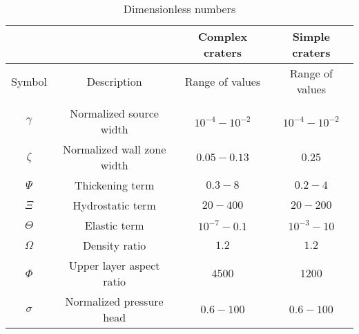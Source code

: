 \begin{table}
  \caption{Dimensionless numbers}
  \centering
  \begin{tabular}{c|c|c|c}
    &&Complex craters&Simple craters \\
    \hline
    Symbol& Description & Range of values & Range of values \\
    \hline
    &&\\
    $\gamma$&Normalized source width& $10^{-4}-10^{-2}$ &$10^{-4}-10^{-2}$ \\
    $\zeta$& Normalized wall zone width  & $0.05-0.13$&$0.25$\\
    $\Psi$&Thickening term & $0.3-8$&$0.2-4$\\
    $\Xi$& Hydrostatic term & $20-400$&$20-200$\\
    $\Theta$ &Elastic term & $10^{-7}-0.1$&$10^{-3}-10$\\
    $\Omega$ & Density ratio & $1.2$ &$1.2$\\
    $\Phi$ & Upper layer aspect ratio & $4500$ &$1200 $\\
    $\sigma$&Normalized pressure head& $0.6-100$ & $0.6-100$ 
                                                   \label{tab3}
  \end{tabular} 
\end{table}






